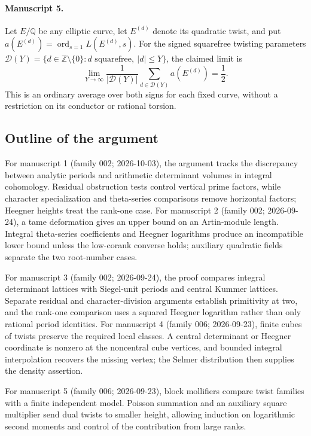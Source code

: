 \documentclass[11pt]{article}
\begin{document}
\paragraph{Manuscript 5.}
Let $E/\mathbb Q$ be any elliptic curve, let $E^{(d)}$ denote its quadratic twist, and put $a(E^{(d)})=\operatorname{ord}_{s=1}L(E^{(d)},s)$. For the signed squarefree twisting parameters $\mathcal D(Y)=\{d\in\mathbb Z\setminus\{0\}:d\text{ squarefree},\ |d|\le Y\}$, the claimed limit is
\[
 \lim_{Y\to\infty}\frac1{|\mathcal D(Y)|}
       \sum_{d\in\mathcal D(Y)}a(E^{(d)})=\frac12.
\]
This is an ordinary average over both signs for each fixed curve, without a restriction on its conductor or rational torsion.

\subsection{Outline of the argument}
For manuscript 1 (family 002; 2026-10-03), the argument tracks the discrepancy between analytic periods and arithmetic determinant volumes in integral cohomology. Residual obstruction tests control vertical prime factors, while character specialization and theta-series comparisons remove horizontal factors; Heegner heights treat the rank-one case. For manuscript 2 (family 002; 2026-09-24), a tame deformation gives an upper bound on an Artin-module length. Integral theta-series coefficients and Heegner logarithms produce an incompatible lower bound unless the low-corank converse holds; auxiliary quadratic fields separate the two root-number cases.

For manuscript 3 (family 002; 2026-09-24), the proof compares integral determinant lattices with Siegel-unit periods and central Kummer lattices. Separate residual and character-division arguments establish primitivity at two, and the rank-one comparison uses a squared Heegner logarithm rather than only rational period identities. For manuscript 4 (family 006; 2026-09-23), finite cubes of twists preserve the required local classes. A central determinant or Heegner coordinate is nonzero at the noncentral cube vertices, and bounded integral interpolation recovers the missing vertex; the Selmer distribution then supplies the density assertion.

For manuscript 5 (family 006; 2026-09-23), block mollifiers compare twist families with a finite independent model. Poisson summation and an auxiliary square multiplier send dual twists to smaller height, allowing induction on logarithmic second moments and control of the contribution from large ranks.
\end{document}
